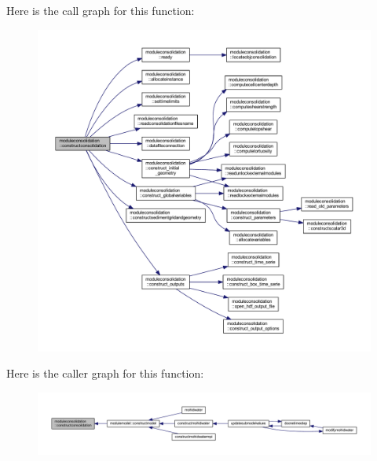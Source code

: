 Here is the call graph for this function\+:\nopagebreak
\begin{figure}[H]
\begin{center}
\leavevmode
\includegraphics[width=350pt]{namespacemoduleconsolidation_aac026f0503f905b1fdf70f85f58f7b69_cgraph}
\end{center}
\end{figure}
Here is the caller graph for this function\+:\nopagebreak
\begin{figure}[H]
\begin{center}
\leavevmode
\includegraphics[width=350pt]{namespacemoduleconsolidation_aac026f0503f905b1fdf70f85f58f7b69_icgraph}
\end{center}
\end{figure}
\mbox{\label{namespacemoduleconsolidation_af867c8406bedea1eef3287708029fa21}} 
